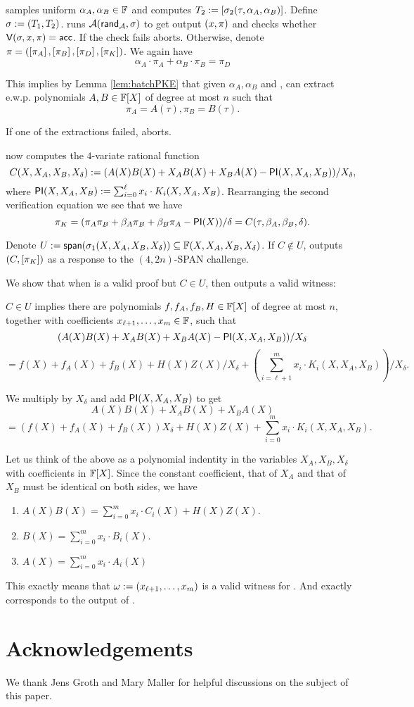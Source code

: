 \documentclass[11pt]{article}
\numberwithin{figure}{section} %
\renewcommand{\span}{\ensuremath{\mathsf{span}}\xspace}
\begin{document}
 \advv samples uniform $\alpha_A,\alpha_B\in\mathbb F$ and computes $T_2:= \left[\sigma_2(\tau,\alpha_A,\alpha_B)\right]$.
 Define $\sigma := (T_1,T_2)$.
 \advv runs $\mathcal A(\mathsf{rand}_{\mathcal A},\sigma)$ to get output $(x,\pi)$
 and checks whether $\mathsf{V}(\sigma,x,\pi)=\mathsf{acc}$.
 If the check fails \advv aborts.
 Otherwise, denote $\pi = (\left[\pi_A\right],\left[\pi_B\right],\left[\pi_D\right],\left[\pi_K\right])$.
 We again have
 \[\alpha_A\cdot  \pi_A + \alpha_B \cdot \pi_B  = \pi_D\]
 
 This implies by Lemma \ref{lem:batchPKE} that given $\alpha_A,\alpha_B$
 and \advrand, \advv can extract e.w.p. \negl polynomials $A,B\in\mathbb F[X]$ of degree at most $n$ such that
 \[\pi_A = A(\tau), \pi_B =B(\tau).\]

 If one of the extractions failed, \advv aborts.
 
 \advv now computes the $4$-variate rational function
 \[C(X,X_A,X_B,X_\delta):= (A(X)B(X)+ X_A B(X) + X_B A(X) - \mathsf{PI}(X,X_A,X_B))/X_{\delta},
 \]
where $\mathsf{PI}(X,X_A,X_B):= \sum_{i=0}^\ell x_i\cdot K_i(X,X_A,X_B)$.
Rearranging the second verification equation we see that we have
\[\pi_K = (\pi_A\pi_B +\beta_A\pi_B + \beta_B\pi_A -\mathsf{PI}(X))/\delta = C(\tau,\beta_A,\beta_B,\delta).\]

Denote $U \defeq \span(\crs_1(X,X_A,X_B,X_\delta))\subseteq \F(X,X_A,X_B,X_\delta)$.
If $C\notin U$, \advv outputs $(C,\left[\pi_K\right])$ as a response to the $(4,2n)$-SPAN challenge.

We show that when \prf is a valid proof but $C\in U$, then \ext outputs a valid witness:

$C\in U$ implies there are polynomials $f,f_A,f_B,H\in \mathbb F[X]$ of degree at most $n$, together with coefficients $x_{\ell+1},\ldots,x_m \in \mathbb F$, such that
\[(A(X)B(X)+ X_A B(X) + X_B A(X) - \mathsf{PI}(X,X_A,X_B))/X_{\delta}\]
\[= f(X)+ f_A(X)+f_B(X)+H(X)Z(X)/X_{\delta}
+\left(\sum_{i=\ell+1}^m x_i\cdot  K_i(X,X_A,X_B)\right)/X_\delta.
\]

We multiply by $X_\delta$ and add $\mathsf{PI}(X,X_A,X_B)$ to get 
\[A(X)B(X)+ X_A B(X) + X_B A(X)\]
\[= (f(X)+ f_A(X)+f_B(X))X_\delta+H(X)Z(X)
+\sum_{i=0}^m  x_i\cdot  K_i(X,X_A,X_B).
\]

Let us think of the above as a polynomial indentity in the variables $X_A,X_B,X_\delta$ with coefficients in $\mathbb F[X]$.
Since the constant coefficient, that of $X_A$ and that of $X_B$ must be identical on both sides, we have
\begin{enumerate}
 \item $A(X)B(X)= \sum_{i=0}^m x_i\cdot C_i(X) + H(X)Z(X)$.
 \item $B(X) = \sum_{i=0}^m x_i\cdot B_i(X)$.
 \item $A(X) = \sum_{i=0}^m x_i \cdot A_i(X)$
\end{enumerate}
This exactly means that $\omega:= (x_{\ell+1},\ldots,x_m)$ 
is a valid witness for \inp.
And \wit exactly corresponds to the output of \ext.
 
 
 \section*{Acknowledgements}
We thank Jens Groth and Mary Maller for helpful discussions on the subject of this paper.
 

\end{document}
